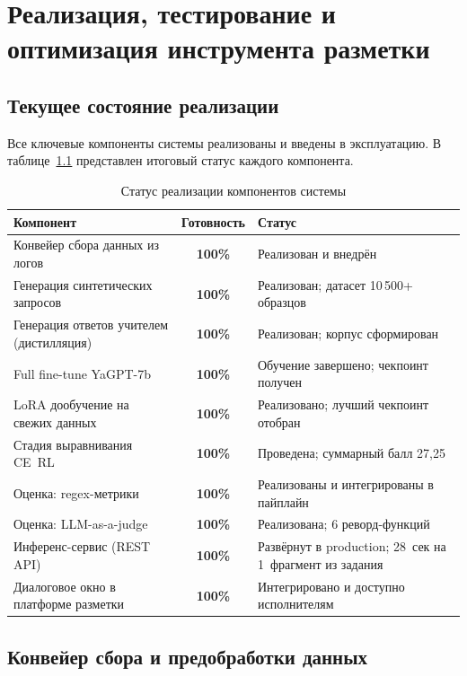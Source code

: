 \documentclass[times]{itmo-student-thesis}
\begin{document}
\chapter{Реализация, тестирование и оптимизация инструмента разметки}

\section{Текущее состояние реализации}

Все ключевые компоненты системы реализованы и введены в эксплуатацию.
В таблице~\ref{tab:progress} представлен итоговый статус каждого компонента.

\begin{table}[H]
\caption{Статус реализации компонентов системы}\label{tab:progress}
\centering
\begin{tabularx}{\textwidth}{|l|c|X|}
\hline
\textbf{Компонент} & \textbf{Готовность} & \textbf{Статус} \\
\hline
Конвейер сбора данных из логов & \textbf{100\%} & Реализован и внедрён \\
\hline
Генерация синтетических запросов & \textbf{100\%} & Реализован; датасет 10\,500+ образцов \\
\hline
Генерация ответов учителем (дистилляция) & \textbf{100\%} & Реализован; корпус сформирован \\
\hline
Full fine-tune YaGPT-7b & \textbf{100\%} & Обучение завершено; чекпоинт получен \\
\hline
LoRA дообучение на свежих данных & \textbf{100\%} & Реализовано; лучший чекпоинт отобран \\
\hline
Стадия выравнивания CE~RL & \textbf{100\%} & Проведена; суммарный балл 27{,}25 \\
\hline
Оценка: regex-метрики & \textbf{100\%} & Реализованы и интегрированы в пайплайн \\
\hline
Оценка: LLM-as-a-judge & \textbf{100\%} & Реализована; 6 реворд-функций \\
\hline
Инференс-сервис (REST API) & \textbf{100\%} & Развёрнут в production; 28~сек на 1~фрагмент из задания \\
\hline
Диалоговое окно в платформе разметки & \textbf{100\%} & Интегрировано и доступно исполнителям \\
\hline
\end{tabularx}
\end{table}

\section{Конвейер сбора и предобработки данных}
\end{document}
